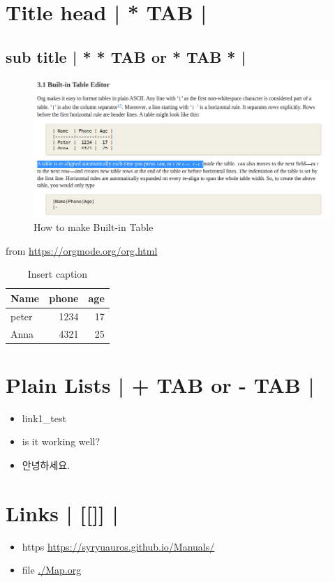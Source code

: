 \documentclass[11pt]{article}
\author{JJ Kim}
\date{\today}
\title{}
\begin{document}
\tableofcontents

\section{Title head  | *  TAB |}
\label{sec:org0373465}
\subsection{sub title | * * TAB or * TAB * |}
\label{sec:orgb29a031}
 \begin{figure}[htbp]
\centering
\includegraphics[width=.9\linewidth]{./img/samples/samples1.png}
\caption{\label{fig:a-1}How to make Built-in Table}
\end{figure}
from \url{https://orgmode.org/org.html}

\begin{table}[htbp]
\caption{\label{table: 1}Insert caption}
\centering
\begin{tabular}{lrr}
Name & phone & age\\
\hline
peter & 1234 & 17\\
Anna & 4321 & 25\\
\end{tabular}
\end{table}



\section{Plain Lists | + TAB or - TAB |}
\label{sec:orged70fe2}
\begin{itemize}
\item link1\_test
\item is it working well?
\item 안녕하세요.
\end{itemize}


\section{Links | [[]] |}
\label{sec:org3dc443a}
\begin{itemize}
\item https    \url{https://syryuauros.github.io/Manuals/}
\item file       \url{./Map.org}
\end{itemize}
\end{document}
